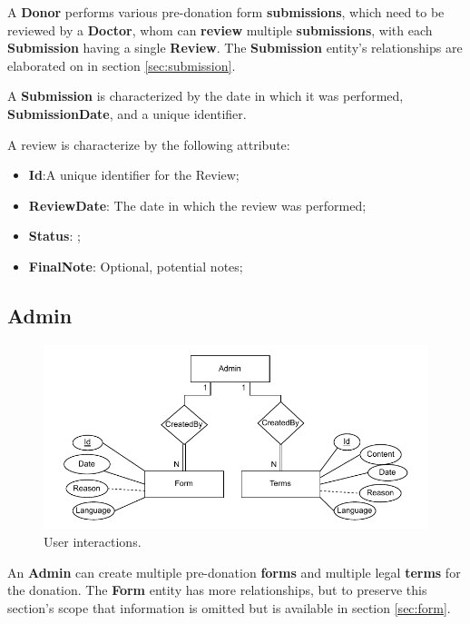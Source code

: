 A \textbf{Donor} performs various pre-donation form \textbf{submissions}, which need to be reviewed by a \textbf{Doctor}, whom can \textbf{review} multiple \textbf{submissions},  with each \textbf{Submission} having a single \textbf{Review}.
The \textbf{Submission} entity's relationships are elaborated on in section \ref{sec:submission}.

A \textbf{Submission} is characterized by the date in which it was performed, \textbf{SubmissionDate}, and a unique identifier.

A review is characterize by the following attribute:
\begin{itemize}
	\item \textbf{Id}:A unique identifier for the Review;
	\item \textbf{ReviewDate}: The date in which the review was performed;
	\item \textbf{Status}: ;
	\item \textbf{FinalNote}: Optional, potential notes;
\end{itemize}





\subsection{Admin}

\begin{figure}[H]
	\begin{center}
		\includegraphics[width=\textwidth,height=\textheight,keepaspectratio]{./figures/Admin_Entity.pdf}
	\end{center}
	\caption{User interactions.}\label{fig:admin_entity}
\end{figure}

An \textbf{Admin} can create multiple pre-donation \textbf{forms} and multiple legal \textbf{terms} for the donation.
The \textbf{Form} entity has more relationships, but to preserve this section's scope that information is omitted but is available in section \ref{sec:form}.

